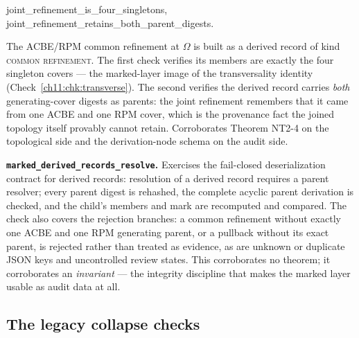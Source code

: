 \begin{checkclass}
\label{ch11:chk:joint}
\begin{center}
\ttfamily
joint\_refinement\_is\_four\_singletons,\\
joint\_refinement\_retains\_both\_parent\_digests.
\end{center}
\noindent The ACBE/RPM
common refinement at $\Omega$ is built as a derived record of kind
\textsc{common refinement}. The first check verifies its members are exactly
the four singleton covers --- the marked-layer image of the transversality
identity (Check~\ref{ch11:chk:transverse}). The second verifies the derived
record carries \emph{both} generating-cover digests as parents: the joint
refinement remembers that it came from one ACBE and one RPM cover, which is
the provenance fact the joined topology itself provably cannot retain.
Corroborates Theorem NT2-4 on the topological side and the derivation-node
schema on the audit side.
\end{checkclass}

\begin{checkclass}
\label{ch11:chk:resolve}
\textbf{\texttt{marked\_derived\_records\_resolve}.} Exercises the
fail-closed deserialization contract for derived records: resolution of a
derived record requires a parent resolver; every parent digest is rehashed,
the complete acyclic parent derivation is checked, and the child's members
and mark are recomputed and compared. The check also covers the rejection
branches: a common refinement without exactly one ACBE and one RPM
generating parent, or a pullback without its exact parent, is rejected
rather than treated as evidence, as are unknown or duplicate JSON keys and
uncontrolled review states. This corroborates no theorem; it corroborates an
\emph{invariant} --- the integrity discipline that makes the marked layer
usable as audit data at all.
\end{checkclass}

\subsection{The legacy collapse checks}
\label{ch11:sec:legacy}

